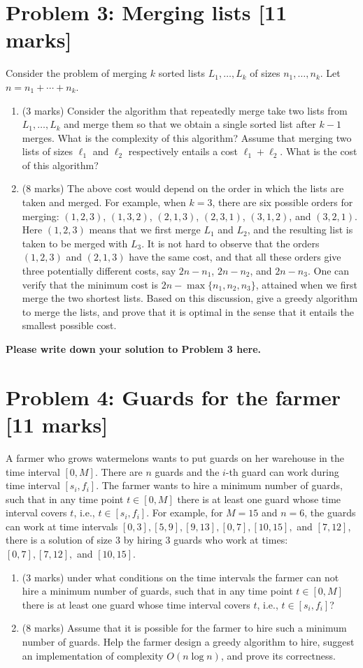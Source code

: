 \documentclass[11pt,twoside]{article}
\newcommand{\problem}[1]{\section*{Problem #1}}
\newenvironment{solution}{{\par\noindent\it Solution.}}{}
\begin{document}
\problem{3: Merging lists [11 marks]}
Consider the problem of merging $k$ sorted lists $L_1,\dots,L_k$ of sizes $n_1,\dots,n_k$. Let $n=n_1+\cdots+n_k$.
\begin{enumerate}
    \item (3 marks) Consider the algorithm that repeatedly merge take two lists from $L_1,\dots,L_k$ and merge them so that we 
    obtain a single sorted list after $k-1$ merges. What is the complexity of this algorithm? Assume that merging two lists of sizes $\ell_1$ and $\ell_2$ respectively entails a cost $\ell_1+\ell_2$. What is the cost of this algorithm?
    \item (8 marks) The above cost would depend on the order in which the lists are taken and merged. For example, when $k=3$, there are six possible orders for merging: $(1,2,3)$, $(1,3,2)$, $(2,1,3)$, $(2,3,1)$, $(3,1,2)$, and $(3,2,1)$. Here $(1,2,3)$ means that we first merge $L_1$ and $L_2$, and the resulting list is taken to be merged with $L_3$. It is not hard to observe that the orders $(1,2,3)$ and $(2,1,3)$ have the same cost, and that all these orders give three potentially different costs, say $2n-n_1$, $2n-n_2$, and $2n-n_3$. One can verify that the minimum cost is $2n-\max\{n_1,n_2,n_3\}$, attained when we first merge the two shortest lists. Based on this discussion, give a greedy algorithm to merge the lists, and prove that it is optimal in the sense that it entails the smallest possible cost.
\end{enumerate}
\begin{solution}
\textbf{Please write down your solution to Problem 3 here.}
\end{solution}



\problem{4: Guards for the farmer [11 marks]}
A farmer who grows watermelons wants to put guards on her warehouse in the time interval $[0,M]$. There are $n$ guards and the $i$-th guard can work during time interval $[s_i,f_i]$. The farmer wants to hire a minimum number of guards, such that in any time point $t\in[0,M]$ there is at least one guard whose time interval covers $t$, i.e., $t\in[s_i,f_i]$. For example, for $M=15$ and $n=6$, the guards can work at time intervals
$[0,3],[5,9],[9,13],[0,7],[10,15],$ and $[7,12]$, there is a solution of size $3$ by hiring $3$ guards who work at times: $[0,7],[7,12],$ and $[10,15]$.
\begin{enumerate}
    \item (3 marks) under what conditions on the time intervals the farmer can not hire a minimum number of guards, such that in any time point $t\in[0,M]$ there is at least one guard whose time interval covers $t$, i.e., $t\in[s_i,f_i]$?
    \item (8 marks) Assume that it is possible for the farmer to hire such a minimum number of guards. Help the farmer design a greedy algorithm to hire, suggest an implementation of complexity $O(n\log n)$, and prove its correctness.
\end{enumerate}
\end{document}
